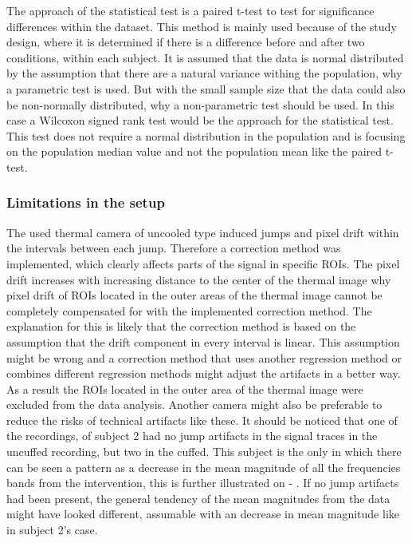The approach of the statistical test is a paired t-test to test for significance differences within the dataset. This method is mainly used because of the study design, where it is determined if there is a difference before and after two conditions, within each subject. It is assumed that the data is normal distributed by the assumption that there are a natural variance withing the population, why a parametric test is used. But with the small sample size that the data could also be non-normally distributed, why a non-parametric test should be used. In this case a Wilcoxon signed rank test would be the approach for the statistical test. This test does not require a normal distribution in the population and is focusing on the population median value and not the population mean like the paired t-test\cite{imam2014}.

\subsubsection{Limitations in the setup}
The used thermal camera of uncooled type induced jumps and pixel drift within the intervals between each jump. Therefore a correction method was implemented, which clearly affects parts of the signal in specific ROIs. The pixel drift increases with increasing distance to the center of the thermal image why pixel drift of ROIs located in the outer areas of the thermal image cannot be completely compensated for with the implemented correction method. The explanation for this is likely that the correction method is based on the assumption that the drift component in every interval is linear. This assumption might be wrong and a correction method that uses another regression method or combines different regression methods might adjust the artifacts in a better way. As a result the ROIs located in the outer area of the thermal image were excluded from the data analysis. Another camera might also be preferable to reduce the risks of technical artifacts like these. 
It should be noticed that one of the recordings, of subject 2 had no jump artifacts in the signal traces in the uncuffed recording, but two in the cuffed. This subject is the only in which there can be seen a pattern as a decrease in the mean magnitude of all the frequencies bands from the intervention, this is further illustrated on  - . If no jump artifacts had been present, the general tendency of the mean magnitudes from the data might have looked different, assumable with an decrease in mean magnitude like in subject 2's case.

